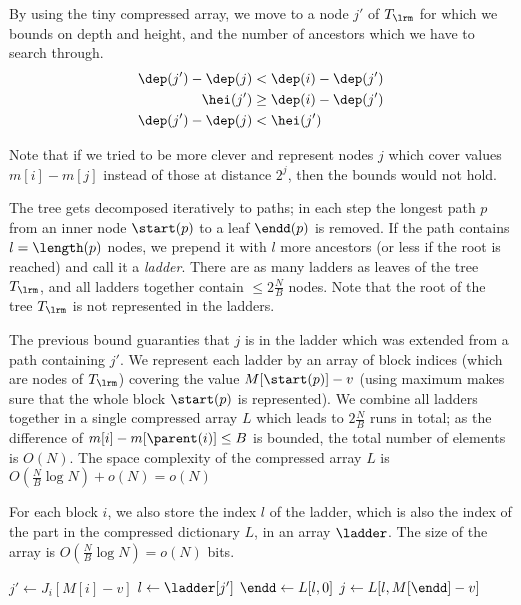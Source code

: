 By using the tiny compressed array, we move to a node $j'$ of $T_{\lrm}$ for which we bounds on depth and height, and the number of ancestors which we have to search through.
\begin{align*}
	\dep(j') - \dep(j) &< \dep(i) - \dep(j') \\
	\hei(j') &\ge \dep(i) - \dep(j') \\
	\dep(j') - \dep(j) &< \hei(j')
\end{align*}

Note that if we tried to be more clever and represent nodes $j$ which cover values $m[i] - m[j]$ instead of those at distance $2^j$, then the bounds would not hold.

\bigbreak

The tree gets decomposed iteratively to paths; in each step the longest path $p$ from an inner node $\start(p)$ to a leaf $\endd(p)$ is removed.
If the path contains $l = \length(p)$ nodes, we prepend it with $l$ more ancestors (or less if the root is reached) and call it a \emph{ladder}.
There are as many ladders as leaves of the tree $T_{\lrm}$, and all ladders together contain $\le 2 \frac{N}{B}$ nodes.
Note that the root of the tree $T_{\lrm}$ is not represented in the ladders.

The previous bound guaranties that $j$ is in the ladder which was extended from a path containing $j'$.
We represent each ladder by an array of block indices (which are nodes of $T_{\lrm}$) covering the value $M[\start(p)] - v$ (using maximum makes sure that the whole block $\start(p)$ is represented).
We combine all ladders together in a single compressed array $L$ which leads to $2 \frac{N}{B}$ runs in total; as the difference of $m[i] - m[\parent(i)] \le B$ is bounded, the total number of elements is $O(N)$.
The space complexity of the compressed array $L$ is $O(\frac{N}{B} \log N) + o(N) = o(N)$

For each block $i$, we also store the index $l$ of the ladder, which is also the index of the part in the compressed dictionary $L$, in an array $\ladder$.
The size of the array is $O(\frac{N}{B} \log N) = o(N)$ bits.

\begin{algorithmic}
	\State $j' \gets J_i[M[i] - v]$ 
	\State $l \gets \ladder[j']$ 
	\State $\endd \gets L[l, 0]$
	\State $j \gets L[l, M[\endd] - v]$ 
	\State {}
\EndFunction
\end{algorithmic}

